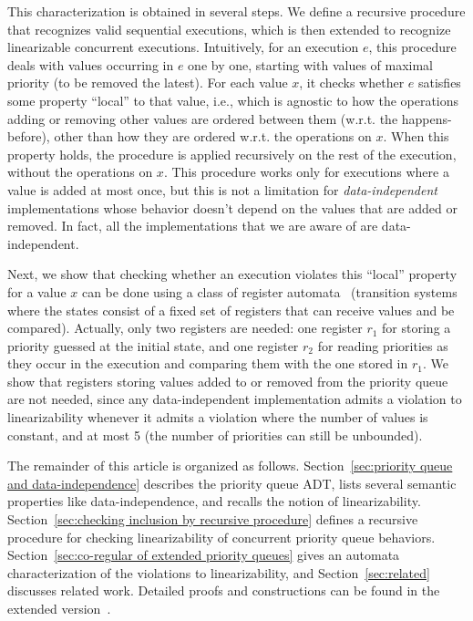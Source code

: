 This characterization is obtained in several steps. We define a recursive procedure that recognizes valid sequential executions, which is then extended to recognize linearizable concurrent executions. Intuitively, for an execution $e$, this procedure deals with values occurring in $e$ one by one, starting with values of maximal priority (to be removed the latest). For each value $x$, it checks whether $e$ satisfies some property ``local'' to that value, i.e., which is agnostic to how the operations adding or removing other values are ordered between them (w.r.t. the happens-before), other than how they are ordered w.r.t. the operations on $x$. When this property holds, the procedure is applied recursively on the rest of the execution, without the operations on $x$. This procedure works only for executions where a value is added at most once, but this is not a limitation for \emph{data-independent} implementations whose behavior doesn't depend on the values that are added or removed. In fact, all the implementations that we are aware of are data-independent.

Next, we show that checking whether an execution violates this ``local'' property for a value $x$ can be done using a class of register automata~\cite{DBLP:journals/tcs/KaminskiF94,DBLP:conf/icalp/Cerans94,DBLP:conf/stacs/SegoufinT11} (transition systems where the states consist of a fixed set of registers that can receive values and be compared). Actually, only two registers are needed: one register $r_1$ for storing a priority guessed at the initial state, and one register $r_2$ for reading priorities as they occur in the execution and comparing them with the one stored in $r_1$. We show that registers storing values added to or removed from the priority queue are not needed, since any data-independent implementation admits a violation to linearizability whenever it admits a violation where the number of values is constant, and at most 5 (the number of priorities can still be unbounded).

The remainder of this article is organized as follows.
Section~\ref{sec:priority queue and data-independence} describes the priority queue ADT, lists several semantic properties like data-independence, and recalls the notion of linearizability.
Section~\ref{sec:checking inclusion by recursive procedure} defines a recursive procedure for checking linearizability of concurrent priority queue behaviors.
Section~\ref{sec:co-regular of extended priority queues} gives an automata characterization of the violations to linearizability, and
Section~\ref{sec:related} discusses related work. Detailed proofs and constructions can be found in the extended version~\cite{CONCUR2017Ahmed}. 




